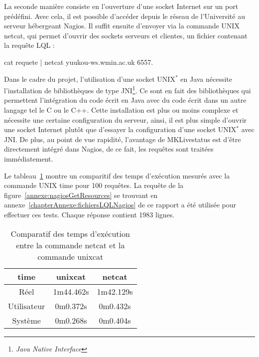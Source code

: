 La seconde mani\`ere consiste en l'ouverture d'une socket Internet sur un port pr\'ed\'efini.
Avec cela, il est possible d'acc\'eder depuis le r\'eseau de l'Universit\'e au serveur h\'ebergeant Nagios.
Il suffit ensuite d'envoyer via la commande UNIX \textsf{netcat}, qui permet d'ouvrir des sockets serveurs et clientes, un fichier contenant la requ\^ete LQL :

\begin{center}
	\textsf{cat requete | netcat yuukou-ws.wmin.ac.uk 6557}.

\end{center}

Dans le cadre du projet, l'utilisation d'une socket UNIX$^*$ en Java n\'ecessite l'installation de biblioth\`eques de type JNI\protect\footnote{\textit{Java Native Interface}}.
Ce sont en fait des biblioth\`eques qui permettent l'int\'egration du code \'ecrit en Java avec du code \'ecrit dans un autre langage tel le C ou le C++.
Cette installation est plus ou moins complexe et n\'ecessite une certaine configuration du serveur, ainsi, il est plus simple d'ouvrir une socket Internet plut\^ot que d'essayer la configuration d'une socket UNIX$^*$ avec JNI.
De plus, au point de vue rapidit\'e, l'avantage de MKLivestatus est d'\^etre directement int\'egr\'e dans Nagios, de ce fait, les requ\^etes sont trait\'ees imm\'ediatement.

Le tableau~\ref{table:comparatifTemps} montre un comparitif des temps d'ex\'ecution mesur\'es avec la commande UNIX \textsf{time} pour 100 requ\^etes.
La requ\^ete de la figure~\ref{annexe:nagiosGetResources} se trouvant en annexe~\ref{chapterAnnexe:fichiersLQLNagios} de ce rapport a \'et\'e utilis\'ee pour effectuer ces tests.
Chaque r\'eponse contient 1983 lignes.

\begin{table}[!ht]
	\centering
	\begin{tabular}{|>{\columncolor{grisclair}}c|c|c|}
		\hline
		\rowcolor{grisclair} \textbf{time} & \textbf{unixcat} & \textbf{netcat}\\
		\hline
		R\'eel & 1m44.462s & 1m42.129s\\
		\hline
		Utilisateur & 0m0.372s & 0m0.432s\\
		\hline
		Syst\`eme & 0m0.268s & 0m0.404s\\
		\hline

	\end{tabular}

	\caption{Comparatif des temps d'ex\'ecution entre la commande \textsf{netcat} et la commande \textsf{unixcat}}
	\label{table:comparatifTemps}

\end{table}

